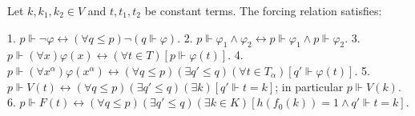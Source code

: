 Let $k, k_1, k_2 \in V$ and $t, t_1, t_2$ be constant terms. The forcing relation satisfies:

1. $p \Vdash \neg \varphi \leftrightarrow (\forall q \leq p) \neg(q \Vdash \varphi)$.
2. $p \Vdash \varphi_1 \land \varphi_2 \leftrightarrow p \Vdash \varphi_1 \land p \Vdash \varphi_2$.
3. $p \Vdash (\forall x)\varphi(x) \leftrightarrow (\forall t \in T)[p \Vdash \varphi(t)]$.
4. $p \Vdash (\forall x^{\alpha})\varphi(x^{\alpha}) \leftrightarrow (\forall q \leq p)(\exists q' \leq q)(\forall t \in T_{\alpha})[q' \Vdash \varphi(t)]$.
5. $p \Vdash V(t) \leftrightarrow (\forall q \leq p)(\exists q' \leq q)(\exists k)[q' \Vdash t = k]$; in particular $p \Vdash V(k)$.
6. $p \Vdash F(t) \leftrightarrow (\forall q \leq p)(\exists q' \leq q)(\exists k \in K)[h(f_0(k)) = 1 \land q' \Vdash t = k]$.
